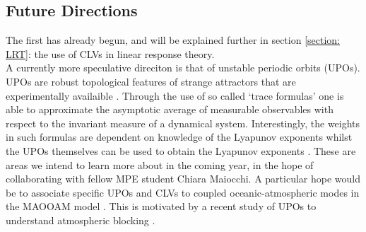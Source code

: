 \subsection{Future Directions} \label{subsection: Lyapunov future}


The first has already begun, and will be explained further in section \ref{section: LRT}: the use of CLVs in linear response theory.\\


A currently more speculative direciton is that of unstable periodic orbits (UPOs). UPOs are robust topological features of strange attractors that are experimentally availaible \cite{Cvitanovic1988}. Through the use of so called `trace formulas' one is able to approximate the asymptotic average of measurable observables with respect to the invariant measure of a dynamical system. Interestingly, the weights in such formulas are dependent on knowledge of the Lyapunov exponents whilst the UPOs themselves can be used to obtain the Lyapunov exponents \cite{Pikovsky2016} \cite{Cvitanovic}. These are areas we intend to learn more about in the coming year, in the hope of collaborating with fellow MPE student Chiara Maiocchi. A particular hope would be to associate specific UPOs and CLVs to coupled oceanic-atmospheric modes in the MAOOAM model \cite{DeCruz2016}. This is motivated by a recent study of UPOs to understand atmospheric blocking \cite{Lucarini2020}.
